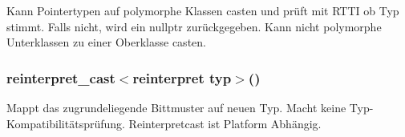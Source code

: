 Kann Pointertypen auf polymorphe Klassen casten und prüft mit RTTI ob Typ stimmt. 
Falls nicht, wird ein nullptr zurückgegeben.
Kann nicht polymorphe Unterklassen zu einer Oberklasse casten. 


\subsubsection{reinterpret\_cast$<$reinterpret typ$>$()}

Mappt das zugrundeliegende Bittmuster auf neuen Typ. 
Macht keine Typ-Kompatibilitätsprüfung. 
Reinterpretcast ist Platform Abhängig.


